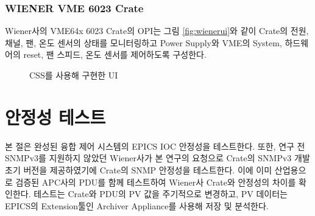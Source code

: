 \documentclass[11pt
  , a4paper
  , article
  , oneside
]{memoir}
\begin{document}
\subsubsection{WIENER VME 6023 Crate }

 Wiener사의 VME64x 6023 Crate의 OPI는 그림 \ref{fig:wienerui}와 같이 Crate의 전원, 채널, 팬, 온도 센서의 상태를 모니터링하고 Power Supply와 VME의 System, 하드웨어의 reset, 팬 스피드, 온도 센서를 제어하도록 구성한다.


 \begin{figure}[h!]
   \centering
               \hfill
               \hfill
   \caption
       {
CSS를 사용해 구현한 UI
       }
  \label{fig:cssopi}
 \end{figure}

\clearpage

\section{안정성 테스트}
본 절은 완성된 융합 제어 시스템의 EPICS IOC 안정성을 테스트한다. 또한, 연구 전 SNMPv3를 지원하지 않았던 Wiener사가 본 연구의 요청으로 Crate의 SNMPv3 개발 초기 버전을 제공하였기에 Crate의 SNMP 안정성을 테스트한다. 이에 이미 산업용으로 검증된 APC사의 PDU를 함께 테스트하여 Wiener사 Crate와 안정성의 차이를 확인한다. 테스트는 Crate와 PDU의 PV 값을 주기적으로 변경하고, PV 데이터는 EPICS의 Extension툴인 Archiver Appliance를 사용해 저장 및 분석한다. 
\end{document}
